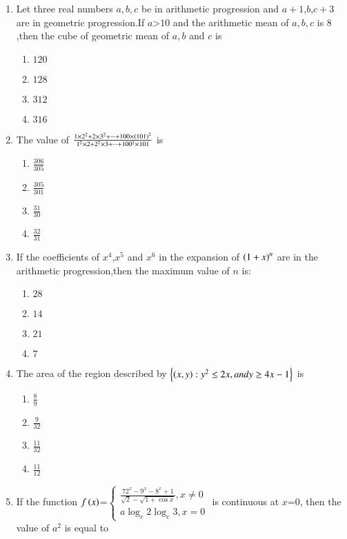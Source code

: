 \documentclass[journal]{IEEEtran}
\begin{document}
\begin{enumerate}[start=16]
    \item Let three real numbers $a,b,c$ be in arithmetic progression and $a+1$,$b$,$c+3$ are in geometric progression.If $a$\textgreater $10$ and the arithmetic mean of $a,b,c$ is $8$ ,then the cube of geometric mean of $a,b$ and $c$ is
    \begin{enumerate}
        \item $120$
        \item $128$
        \item $312$
        \item $316$
    \end{enumerate}
    \item The value of $\frac{1\times2^2+2\times3^2+\dots+100\times\left(101\right)^2}{1^2\times2+2^2\times3+\dots+100^2\times101}$ is
    \begin{enumerate}
        \item $\frac{306}{305}$
        \item $\frac{305}{301}$
        \item $\frac{31}{30}$
        \item $\frac{32}{31}$
    \end{enumerate}
    \item If the coefficients of $x^4$,$x^5$ and $x^6$ in the expansion of $\left(1+x\right)^n$ are in the arithmetic progression,then the maximum value of $n$ is:
    \begin{enumerate}
        \item $28$
        \item $14$
        \item $21$
        \item $7$
    \end{enumerate}
    \item The area  of the region described by $\left\{\left(x,y\right):y^2\leq 2x,and y\geq4x-1\right\}$ is 
    \begin{enumerate}
        \item $\frac{8}{9}$
        \item $\frac{9}{32}$
        \item $\frac{11}{32}$
        \item $\frac{11}{12}$
    \end{enumerate}
    \item If the function $f\left(x\right)$=$\begin{cases}\frac{72^x-9^x-8^x+1}{\sqrt{2}-\sqrt{1+\cos{x}}},x\neq 0\\a\log_e2\log_e3,x=0\end{cases}$ is continuous at $x$=$0$, then the value of $a^2$ is equal to

\end{enumerate}
\end{document}
